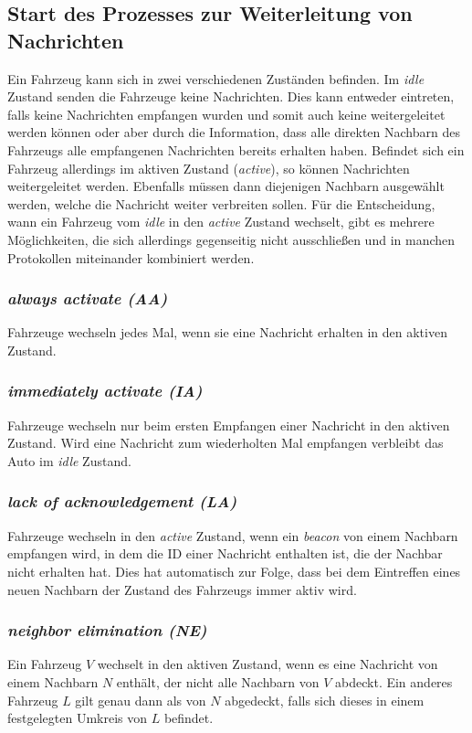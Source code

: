 \documentclass[english,runningheads,a4paper]{llncs}[2018/03/10]
\begin{document}
\subsection{Start des Prozesses zur Weiterleitung von Nachrichten}\label{subsec:forwarder-selection}
Ein Fahrzeug kann sich in zwei verschiedenen Zuständen befinden.
Im \textit{idle} Zustand senden die Fahrzeuge keine Nachrichten.
Dies kann entweder eintreten, falls keine Nachrichten empfangen wurden und somit auch keine weitergeleitet werden können oder aber durch die Information, dass alle direkten Nachbarn des Fahrzeugs alle empfangenen Nachrichten bereits erhalten haben.
Befindet sich ein Fahrzeug allerdings im aktiven Zustand (\textit{active}), so können Nachrichten weitergeleitet werden.
Ebenfalls müssen dann diejenigen Nachbarn ausgewählt werden, welche die Nachricht weiter verbreiten sollen.
Für die Entscheidung, wann ein Fahrzeug vom \textit{idle} in den \textit{active} Zustand wechselt, gibt es mehrere Möglichkeiten, die sich allerdings gegenseitig nicht ausschließen und in manchen Protokollen miteinander kombiniert werden.
\subsubsection{\textit{always activate (AA)}}
Fahrzeuge wechseln jedes Mal, wenn sie eine Nachricht erhalten in den aktiven Zustand.
\subsubsection{\textit{immediately activate (IA)}}
Fahrzeuge wechseln nur beim ersten Empfangen einer Nachricht in den aktiven Zustand.
Wird eine Nachricht zum wiederholten Mal empfangen verbleibt das Auto im \textit{idle} Zustand.
\subsubsection{\textit{lack of acknowledgement (LA)}}
Fahrzeuge wechseln in den \textit{active} Zustand, wenn ein \textit{beacon} von einem Nachbarn empfangen wird, in dem die ID einer Nachricht enthalten ist, die der Nachbar nicht erhalten hat.
Dies hat automatisch zur Folge, dass bei dem Eintreffen eines neuen Nachbarn der Zustand des Fahrzeugs immer aktiv wird.
\subsubsection{\textit{neighbor elimination (NE)}}
Ein Fahrzeug $V$ wechselt in den aktiven Zustand, wenn es eine Nachricht von einem Nachbarn $N$ enthält, der nicht alle Nachbarn von $V$ abdeckt.
Ein anderes Fahrzeug $L$ gilt genau dann als von $N$ abgedeckt, falls sich dieses in einem festgelegten Umkreis von $L$ befindet\cite{conti2013mobile}.
\end{document}

